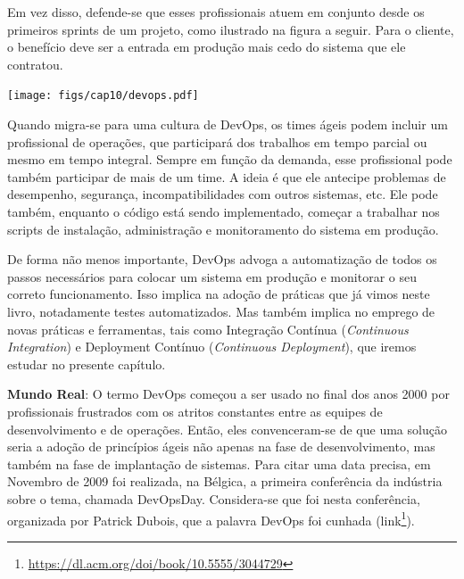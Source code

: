 \documentclass[
  11pt,
  twoside]{book}
\DeclareRobustCommand{\href}[2]{#2\footnote{\url{#1}}}
\newenvironment{esmbox}{\centering \vspace{1.5ex} \begin{tcolorbox}[breakable, colback=backcolor, width=4.9in]}{\end{tcolorbox} \vspace{1.5ex}}
\let\origfigure\figure
\let\endorigfigure\endfigure
\renewenvironment{figure}[1][2] {
    \expandafter\origfigure\expandafter[!h]
} {
    \endorigfigure
}
\begin{document}
Em vez disso, defende-se que esses profissionais atuem em conjunto desde
os primeiros sprints de um projeto, como ilustrado na figura a seguir.
Para o cliente, o benefício deve ser a entrada em produção mais cedo do
sistema que ele contratou.

\begin{figure}
\centering
\texttt{[image: figs/cap10/devops.pdf]}
\caption{Organização baseada em DevOps. Frequentemente, Devs e Ops
sentam juntos para discutir questões sobre a entrega do sistema.}
\end{figure}

Quando migra-se para uma cultura de DevOps, os times ágeis podem incluir
um profissional de operações, que participará dos trabalhos em tempo
parcial ou mesmo em tempo integral. Sempre em função da demanda, esse
profissional pode também participar de mais de um time. A ideia é que
ele antecipe problemas de desempenho, segurança, incompatibilidades com
outros sistemas, etc. Ele pode também, enquanto o código está sendo
implementado, começar a trabalhar nos scripts de instalação,
administração e monitoramento do sistema em produção.

De forma não menos importante, DevOps advoga a automatização de todos os
passos necessários para colocar um sistema em produção e monitorar o seu
correto funcionamento. Isso implica na adoção de práticas que já vimos
neste livro, notadamente testes automatizados. Mas também implica no
emprego de novas práticas e ferramentas, tais como Integração Contínua
(\emph{Continuous Integration}) e Deployment Contínuo (\emph{Continuous
Deployment}), que iremos estudar no presente capítulo.


\begin{esmbox}

\textbf{Mundo Real}: O termo DevOps começou a ser usado no final dos
anos 2000 por profissionais frustrados com os atritos constantes entre
as equipes de desenvolvimento e de operações. Então, eles convenceram-se
de que uma solução seria a adoção de princípios ágeis não apenas na fase
de desenvolvimento, mas também na fase de implantação de sistemas. Para
citar uma data precisa, em Novembro de 2009 foi realizada, na Bélgica, a
primeira conferência da indústria sobre o tema, chamada DevOpsDay.
Considera-se que foi nesta conferência, organizada por Patrick Dubois,
que a palavra DevOps foi cunhada
(\href{https://dl.acm.org/doi/book/10.5555/3044729}{link}).

\end{esmbox}
\end{document}
